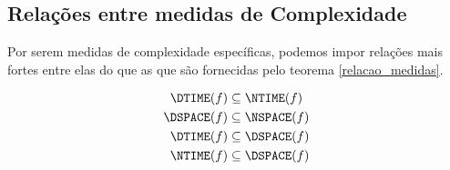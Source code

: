\subsection{Relações entre medidas de Complexidade}

Por serem medidas de complexidade específicas,
podemos impor relações mais fortes entre elas
do que as que são fornecidas pelo teorema \ref{relacao_medidas}.

\begin{proposition}
    \begin{align}
        \DTIME(f) &\subseteq \NTIME(f) \label{dtime_in_ntime} \\
        \DSPACE(f) &\subseteq \NSPACE(f) \label{dspace_in_nspace} \\
        \DTIME(f) &\subseteq \DSPACE(f) \label{dtime_in_dspace} \\
        \NTIME(f) &\subseteq \DSPACE(f) \label{ntime_in_dspace}
    \end{align}
\end{proposition}
